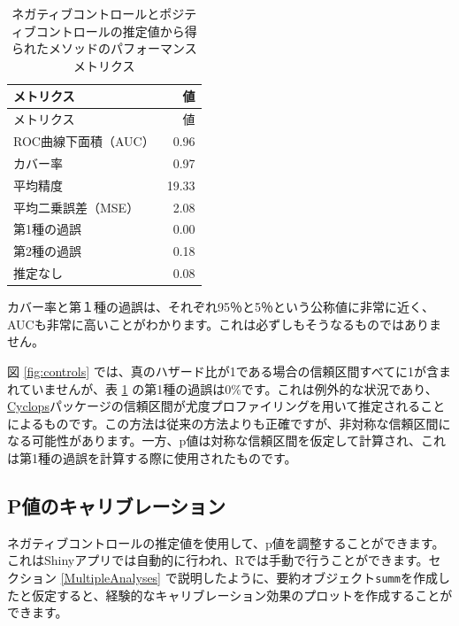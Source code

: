 \documentclass[
  11pt]{book}
\theoremstyle{definition}
\theoremstyle{definition}
\theoremstyle{definition}
\theoremstyle{definition}
\theoremstyle{remark}
\begin{document}
\begin{longtable}[]{@{}lr@{}}
\caption{\label{tab:exampleMetrics} ネガティブコントロールとポジティブコントロールの推定値から得られたメソッドのパフォーマンスメトリクス}\tabularnewline
\toprule\noalign{}
メトリクス & 値 \\
\midrule\noalign{}
\endfirsthead
\toprule\noalign{}
メトリクス & 値 \\
\midrule\noalign{}
\endhead
\bottomrule\noalign{}
\endlastfoot
ROC曲線下面積（AUC） & 0.96 \\
カバー率 & 0.97 \\
平均精度 & 19.33 \\
平均二乗誤差（MSE） & 2.08 \\
第1種の過誤 & 0.00 \\
第2種の過誤 & 0.18 \\
推定なし & 0.08 \\
\end{longtable}

カバー率と第１種の過誤は、それぞれ95％と5％という公称値に非常に近く、AUCも非常に高いことがわかります。これは必ずしもそうなるものではありません。

図 \ref{fig:controls} では、真のハザード比が1である場合の信頼区間すべてに1が含まれていませんが、表 \ref{tab:exampleMetrics} の第1種の過誤は0\%です。これは例外的な状況であり、\href{https://ohdsi.github.io/Cyclops/}{Cyclops}パッケージの信頼区間が尤度プロファイリングを用いて推定されることによるものです。この方法は従来の方法よりも正確ですが、非対称な信頼区間になる可能性があります。一方、p値は対称な信頼区間を仮定して計算され、これは第1種の過誤を計算する際に使用されたものです。

\subsection{P値のキャリブレーション}\label{pux5024ux306eux30adux30e3ux30eaux30d6ux30ecux30fcux30b7ux30e7ux30f3-1}

ネガティブコントロールの推定値を使用して、p値を調整することができます。これはShinyアプリでは自動的に行われ、Rでは手動で行うことができます。セクション \ref{MultipleAnalyses} で説明したように、要約オブジェクト\texttt{summ}を作成したと仮定すると、経験的なキャリブレーション効果のプロットを作成することができます。
\end{document}
